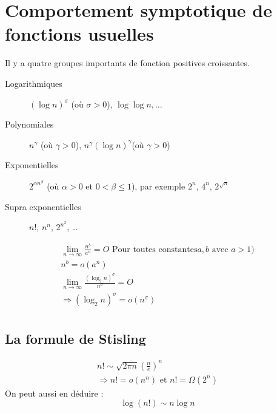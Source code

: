	\section{Comportement symptotique de fonctions usuelles}
	Il y a quatre groupes importants de fonction positives croissantes.
	\begin{description}
		\item[Logarithmiques] $(\log n)^\sigma$ (où $\sigma > 0$), $\log\log n, \ldots$
		\item[Polynomiales] $n^\gamma$ (où $\gamma > 0$), $n^\gamma(\log n)^\gamma$(où $\gamma > 0$)
		\item[Exponentielles] $2^{\alpha n^\beta}$ (où $\alpha > 0$ et $0 < \beta \leq 1$), par exemple $2^n$, $4^n$, $2^{\sqrt{n}}$
		\item[Supra exponentielles] $n!$, $n^n$, $2^{n^2}$, \ldots
	\end{description}

	\begin{eqnarray*}
		\lim_{n\rightarrow \infty} \frac{n^b}{a^n} = O \textrm{ Pour toutes constantes} a,b \textrm{ avec } a > 1 \textrm{)}\\
		n^b = o(a^n)\\
		\lim_{n\rightarrow \infty} \frac{(\log_2 n)^{\sigma}}{n^\sigma} = O\\
		\Rightarrow (\log_2 n)^\sigma = o(n^\sigma)\\
	\end{eqnarray*}


	\subsection{La formule de Stisling}
	\begin{eqnarray*}
		n! \sim \sqrt{2\pi n}(\frac{n}{e})^n\\
		\Rightarrow n! = o(n^n) \textrm{ et } n! = \Omega(2^n)
	\end{eqnarray*}
	On peut aussi en déduire :
	$$\log(n!) \sim n\log n$$


